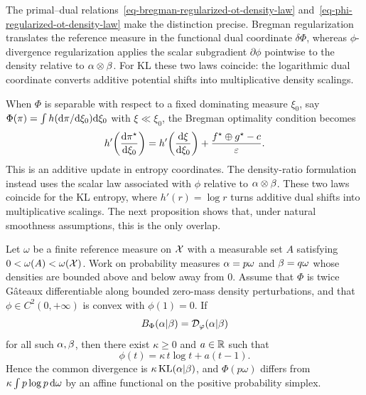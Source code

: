 The primal--dual relations~\eqref{eq-bregman-regularized-ot-density-law} and~\eqref{eq-phi-regularized-ot-density-law} make the distinction precise. Bregman regularization translates the reference measure in the functional dual coordinate $\delta\Phi$, whereas $\phi$-divergence regularization applies the scalar subgradient $\partial\phi$ pointwise to the density relative to $\alpha\otimes\beta$. For KL these two laws coincide: the logarithmic dual coordinate converts additive potential shifts into multiplicative density scalings.

When $\Phi$ is separable with respect to a fixed dominating measure $\xi_0$, say $\Phi(\pi)=\int h(\mathrm{d}\pi/\mathrm{d}\xi_0)\mathrm{d}\xi_0$ with $\xi\ll\xi_0$, the Bregman optimality condition becomes
\[
	h'\!\left(\frac{\mathrm{d}\pi^\star}{\mathrm{d}\xi_0}\right)
	=
	h'\!\left(\frac{\mathrm{d}\xi}{\mathrm{d}\xi_0}\right)
	+
	\frac{f^\star\oplus g^\star-c}{\varepsilon}.
\]
This is an additive update in entropy coordinates. The density-ratio formulation instead uses the scalar law associated with $\phi$ relative to $\alpha\otimes\beta$. These two laws coincide for the KL entropy, where $h'(r)=\log r$ turns additive dual shifts into multiplicative scalings. The next proposition shows that, under natural smoothness assumptions, this is the only overlap.

\begin{prop}\label{prop-kl-only-bregman-phi}
	Let $\omega$ be a finite reference measure on $\mathcal{X}$ with a measurable set $A$ satisfying $0<\omega(A)<\omega(\mathcal{X})$. Work on probability measures $\alpha=p\omega$ and $\beta=q\omega$ whose densities are bounded above and below away from $0$. Assume that $\Phi$ is twice G\^ateaux differentiable along bounded zero-mass density perturbations, and that $\phi\in C^2(0,+\infty)$ is convex with $\phi(1)=0$. If
	\[
		B_\Phi(\alpha|\beta)=\mathcal{D}_\varphi(\alpha|\beta)
	\]
	for all such $\alpha,\beta$, then there exist $\kappa\geq0$ and $a\in\mathbb{R}$ such that
	\[
		\phi(t)=\kappa\,t\log t+a(t-1).
	\]
	Hence the common divergence is $\kappa\operatorname{KL}(\alpha|\beta)$, and $\Phi(p\omega)$ differs from $\kappa\int p\log p\,\mathrm{d}\omega$ by an affine functional on the positive probability simplex.
\end{prop}

